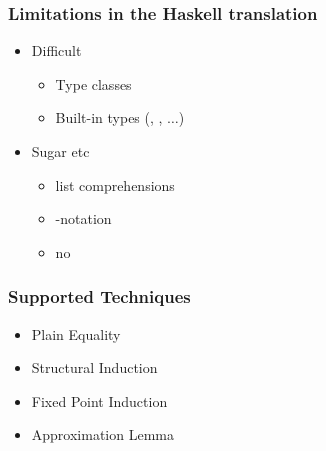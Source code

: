 \documentclass[serif,professionalfont]{beamer}
\begin{document}
\begin{frame}[fragile]
  \frametitle{Limitations in the Haskell translation}
  \begin{itemize}
    \item Difficult
      \begin{itemize}
        \item Type classes \\
        \item Built-in types (, ,  $\ldots$)
      \end{itemize}
    \item Sugar etc
      \begin{itemize}
        \item list comprehensions \\
        \item {}-notation \\
        \item no 
      \end{itemize}
  \end{itemize}
\end{frame}

%

\begin{frame}[fragile]
\frametitle{Supported Techniques}
\label{sec-4}
\begin{itemize}

\item Plain Equality \\
\item Structural Induction \\
\item Fixed Point Induction \\
\item Approximation Lemma

%
%
%
%

\end{itemize} %
\end{frame}
\end{document}
